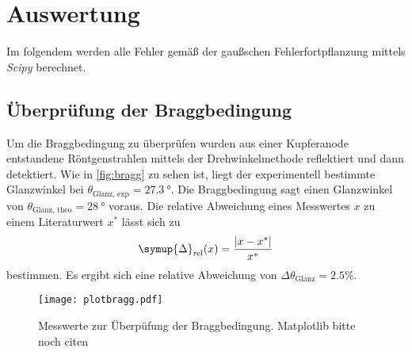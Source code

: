 \section{Auswertung}
\label{sec:Auswertung}
Im folgendem werden alle Fehler gemäß der gaußschen Fehlerfortpflanzung mittels \textit{Scipy}\cite{scipy} berechnet.
\subsection{Überprüfung der Braggbedingung}
\label{subsec:bragg}
Um die Braggbedingung zu überprüfen wurden aus einer Kupferanode entstandene Röntgenstrahlen mittels der Drehwinkelmethode reflektiert und dann detektiert. Wie in 
\autoref{fig:bragg} zu sehen ist, liegt der experimentell bestimmte Glanzwinkel bei $\theta_\text{Glanz, exp} = \qty{27.3}{\degree}$. Die Braggbedingung sagt einen 
Glanzwinkel von $\theta_\text{Glanz, theo} = \qty{28}{\degree}$ voraus.
Die relative Abweichung eines Messwertes $x$ zu einem Literaturwert $x^*$ lässt sich zu 
\begin{equation}
  \label{eqn:Delta_rel}
  \symup{\Delta}_\text{rel}(x) = \frac{|x - x^*|}{x^*}
\end{equation}
bestimmen.
Es ergibt sich eine relative Abweichung von $\Delta \theta_\text{Glanz} = 2.5\%$.
\begin{figure}
    \centering
    \texttt{[image: plotbragg.pdf]}
    \caption{Messwerte zur Überpüfung der Braggbedingung. Matplotlib bitte noch citen}
    \label{fig:bragg}
\end{figure}

